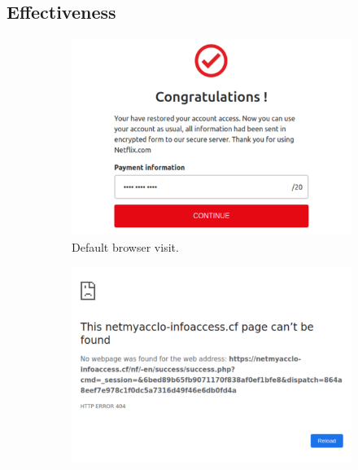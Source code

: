 


\subsection{Effectiveness}
\label{ss:effectiveness}

\begin{figure}
\centering
	\begin{subfigure}[tb]{.31\textwidth}
		\includegraphics[width=\linewidth]{figs/netflix_n.pdf}
        \caption{Default browser visit.}
        \label{fig:normal}
	\end{subfigure}%
	\quad
	\begin{subfigure}[tb]{.31\textwidth}
		\includegraphics[width=\linewidth]{figs/netflix_sp.pdf}

\end{subfigure}
\end{figure}
